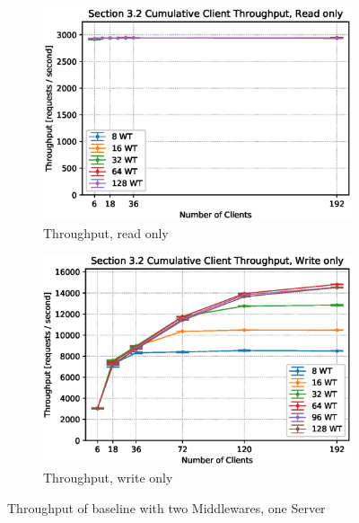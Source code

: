 \documentclass[11pt,a4paper]{article}
\begin{document}
\begin{figure}
    \begin{subfigure}{.5\textwidth}
        \includegraphics[width=1\linewidth]{plots/3_2a_throughputMiddleware.eps}
        \caption{Throughput, read only}
    \end{subfigure}
    \begin{subfigure}{.5\textwidth}
        \includegraphics[width=1\linewidth]{plots/3_2b_throughputMiddleware.eps}
        \caption{Throughput, write only}
    \end{subfigure}

    \caption{Throughput of baseline with two Middlewares, one Server}
    \label{fig:3-2-throughput}
\end{figure}
\end{document}
